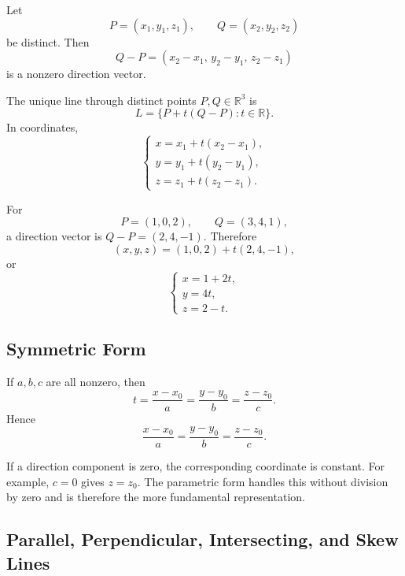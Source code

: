 \begin{derivationbox}
Let
\[
P=(x_1,y_1,z_1),
\qquad
Q=(x_2,y_2,z_2)
\]
be distinct. Then
\[
Q-P=(x_2-x_1,\,y_2-y_1,\,z_2-z_1)
\]
is a nonzero direction vector.
\end{derivationbox}

\begin{theorembox}
The unique line through distinct points $P,Q\in\mathbb R^3$ is
\[
\boxed{L=\{P+t(Q-P):t\in\mathbb R\}}.
\]
In coordinates,
\[
\boxed{
\begin{cases}
x=x_1+t(x_2-x_1),\\
y=y_1+t(y_2-y_1),\\
z=z_1+t(z_2-z_1).
\end{cases}
}
\]
\end{theorembox}

\begin{examplebox}
For
\[
P=(1,0,2),
\qquad
Q=(3,4,1),
\]
a direction vector is $Q-P=(2,4,-1)$. Therefore
\[
(x,y,z)=(1,0,2)+t(2,4,-1),
\]
or
\[
\begin{cases}
x=1+2t,\\
y=4t,\\
z=2-t.
\end{cases}
\]
\end{examplebox}

\subsection{Symmetric Form}

\begin{derivationbox}
If $a,b,c$ are all nonzero, then
\[
t=\frac{x-x_0}{a}
=\frac{y-y_0}{b}
=\frac{z-z_0}{c}.
\]
Hence
\[
\boxed{
\frac{x-x_0}{a}
=
\frac{y-y_0}{b}
=
\frac{z-z_0}{c}
}.
\]
\end{derivationbox}

\begin{remarkbox}
If a direction component is zero, the corresponding coordinate is constant. For
example, $c=0$ gives $z=z_0$. The parametric form handles this without division
by zero and is therefore the more fundamental representation.
\end{remarkbox}

\subsection{Parallel, Perpendicular, Intersecting, and Skew Lines}


